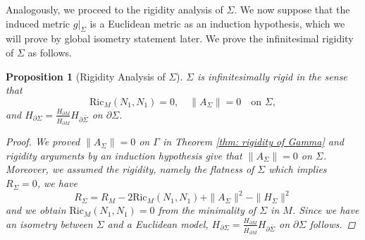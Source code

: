 \documentclass[11pt,letterpaper]{amsart}
\newtheorem{prop}{Proposition}[section]
\begin{document}
Analogously, we proceed to the rigidity analysis of $\Sigma$. We now suppose that the induced metric $g|_{\Sigma}$ is a Euclidean metric as an induction hypothesis, which we will prove by global isometry statement later. We prove the infinitesimal rigidity of $\Sigma$ as follows.
\begin{prop} [Rigidity Analysis of $\Sigma$] \label{prop : rigidity sigma}
    $\Sigma$ is infinitesimally rigid in the sense that
    \begin{equation*}
        \text{Ric}_{M}(N_1,N_1)=0, \quad  \|A_{\Sigma}\|=0 \quad \text{on } \Sigma,
    \end{equation*}
    and $H_{\partial\Sigma}=\frac{H_{\partial M}}{\bar{H}_{\partial M}}H_{\partial\bar{\Sigma}}$ on $\partial \Sigma$.
    \begin{proof}
        We proved $\|A_{\Sigma}\|=0$ on $\Gamma$ in Theorem \ref{thm: rigidity of Gamma} and rigidity arguments by an induction hypothesis give that $\|A_{\Sigma}\|=0$ on $\Sigma$. Moreover, we assumed the rigidity, namely the flatness of $\Sigma$ which implies $R_{\Sigma}=0$, we have
        \begin{equation*}
        R_{\Sigma} = R_{M} - 2 \text{Ric}_{M}(N_1,N_1) + \|A_{\Sigma}\|^{2}- \|H_{\Sigma}\|^{2}
        \end{equation*}
        and we obtain $\text{Ric}_{M}(N_1,N_1)=0$ from the minimality of $\Sigma$ in $M$. Since we have an isometry between $\Sigma$ and a Euclidean model, $H_{\partial\Sigma}=\frac{H_{\partial M}}{\bar{H}_{\partial M}}H_{\partial\bar{\Sigma}}$ on $\partial \Sigma$ follows.
    \end{proof}
\end{prop}    
\end{document}

